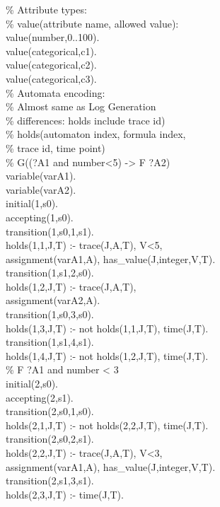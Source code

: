 \begin{small}
\begin{aspcode}
\noindent
\% Attribute types:\\
\% value(attribute name, allowed value):\\
value(number,0..100).\\
value(categorical,c1).\\
value(categorical,c2).\\
value(categorical,c3).\\

\noindent
\% Automata encoding:\\
\% Almost same as Log Generation\\
\% differences: holds include trace id)\\
\% holds(automaton index, formula index,\\ 
\% \phantom{holds(au} trace id, time point)\\

\noindent
\% G((?A1 and number<5) -> F ?A2)\\
variable(varA1).\\
variable(varA2).\\
initial(1,s0).\\
accepting(1,s0).\\
transition(1,s0,1,s1).\\
holds(1,1,J,T) :- trace(J,A,T), V<5,\\ 
\phantom{ho}assignment(varA1,A), has\_value(J,integer,V,T).\\ 
transition(1,s1,2,s0).\\
holds(1,2,J,T) :- trace(J,A,T),\\ 
\phantom{holds(1,2,J,T) :- }assignment(varA2,A).\\
transition(1,s0,3,s0).\\
holds(1,3,J,T) :- not holds(1,1,J,T), time(J,T).\\
transition(1,s1,4,s1).\\
holds(1,4,J,T) :- not holds(1,2,J,T), time(J,T).\\

\noindent 
\% F ?A1 and number < 3\\
initial(2,s0).\\
accepting(2,s1).\\
transition(2,s0,1,s0).\\
holds(2,1,J,T) :- not holds(2,2,J,T), time(J,T).\\ 
transition(2,s0,2,s1).\\
holds(2,2,J,T) :- trace(J,A,T), V<3,\\ 
\phantom{ho}assignment(varA1,A), has\_value(J,integer,V,T).\\
transition(2,s1,3,s1).\\
holds(2,3,J,T) :- time(J,T).\\


\end{aspcode}
\end{small}
